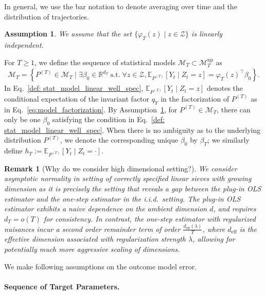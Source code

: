 \documentclass[11pt]{article}
\newtheorem{assum}{Assumption}
\newtheorem{rem}{Remark}
\begin{document}
In general, we use the bar notation to denote averaging over time and the distribution of trajectories. 
\begin{assum}
\label{eq: characteristic_feature}
We assume that the set $\{\varphi_T(z) \mid z \in \mathcal{Z}\}$ is linearly independent. 
\end{assum}
For $T\geq 1$, we define the sequence of statistical models $\mathcal{M}_T\subset \mathcal{M}_T^{\mathrm{np}}$ as 
\begin{align}
\label{def: stat_model_linear_well_spec}
    \mathcal{M}_T = \left\{P^{(T)} \in \mathcal{M}_T \mid \exists \beta_0 \in \mathbb R^{d_T} \;\text{s.t.}\;\forall z\in \mathcal{Z}, 
    \mathbb{E}_{P^{(T)}}[Y_t \mid Z_t = z] = \varphi_T(z)^{\top}\beta_0\right\}. 
\end{align}
In Eq.~\eqref{def: stat_model_linear_well_spec}, $\mathbb{E}_{P^{(T)}}[Y_t \mid Z_t = z]$ denotes the conditional expectation of the invariant factor $q_Y$ in the factorization of $P^{(T)}$ as in Eq.~\eqref{eq:model_factorization}. By Assumption~\ref{eq: characteristic_feature}, for $P^{(T)}\in \mathcal{M}_T$, there can only be one $\beta_0$ satisfying the condition in Eq.~\eqref{def: stat_model_linear_well_spec}. When there is no ambiguity as to the underlying distribution $P^{(T)}$, we denote the corresponding unique $\beta_0$ by $\beta_T$; we similarly define $h_T := \mathbb{E}_{P^{(T)}}[Y_t\mid Z_t = \cdot]$. 


\begin{rem}[Why do we consider high dimensional setting?]
    We consider asymptotic normality in setting of correctly specified linear sieves with growing dimension as it is precisely the setting that reveals a gap between the plug-in OLS estimator and the one-step estimator in the i.i.d.\ setting. The plug-in OLS estimator exhibits a naive dependence on the ambient dimension $d$, and requires $d_T = o(T)$ for consistency. In contrast, the one-step estimator with regularized nuisances incur a second order remainder term of order $\frac{d_{\mathrm{eff}}(\lambda)}{T}$, where $d_{\mathrm{eff}}$ is the effective dimension associated with regularization strength $\lambda$, allowing for potentially much more aggressive scaling of dimensions. 
\end{rem}

We make following assumptions on the outcome model error.

\paragraph{Sequence of Target Parameters.}
\end{document}
